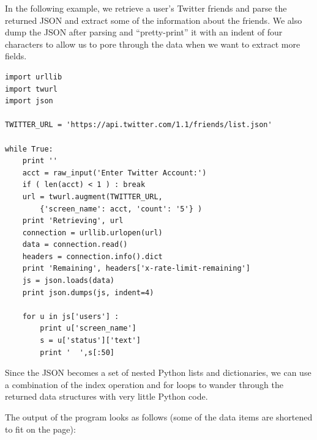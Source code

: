 \documentclass[11pt]{book}
\begin{document}
In the following example, we retrieve a user's Twitter friends
and parse the returned JSON and extract some of the information
about the friends.  We also dump the JSON after parsing and
``pretty-print'' it with an indent of four characters to allow
us to pore through the data when we want to extract more fields.

\beforeverb
\begin{verbatim}
import urllib
import twurl
import json

TWITTER_URL = 'https://api.twitter.com/1.1/friends/list.json'

while True:
    print ''
    acct = raw_input('Enter Twitter Account:')
    if ( len(acct) < 1 ) : break
    url = twurl.augment(TWITTER_URL,
        {'screen_name': acct, 'count': '5'} )
    print 'Retrieving', url
    connection = urllib.urlopen(url)
    data = connection.read()
    headers = connection.info().dict
    print 'Remaining', headers['x-rate-limit-remaining']
    js = json.loads(data)
    print json.dumps(js, indent=4)

    for u in js['users'] :
        print u['screen_name']
        s = u['status']['text']
        print '  ',s[:50]
\end{verbatim}
\afterverb
%
Since the JSON becomes a set of nested Python lists and dictionaries,
we can use a combination of the index operation and for loops to 
wander through the returned data structures with very little 
Python code.

The output of the program looks as follows (some of the data items 
are shortened to fit on the page):
\end{document}
